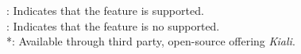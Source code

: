 \begin{table*}[t]
{%

\cmark: Indicates that the feature is supported. \\
\xmark: Indicates that the feature is no supported. \\
*: Available through third party, open-source offering \textit{Kiali}.
}
\label{tab:result-observability}
\end{table*}

